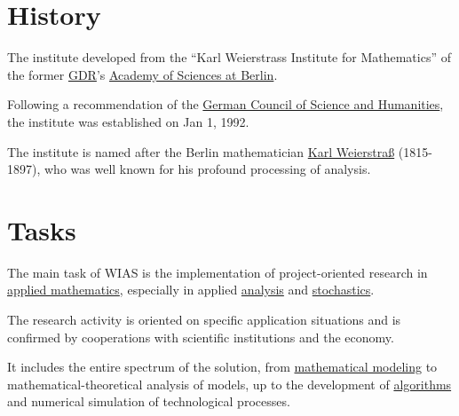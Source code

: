 \documentclass{book}
\numberwithin{equation}{section}
\begin{document}
\section{History}
The institute developed from the ``Karl Weierstrass Institute for Mathematics'' of the former \href{https://en.wikipedia.org/wiki/GDR}{GDR}'s \href{https://en.wikipedia.org/wiki/German_Academy_of_Sciences_at_Berlin}{Academy of Sciences at Berlin}.

Following a recommendation of the \href{https://en.wikipedia.org/wiki/German_Council_of_Science_and_Humanities}{German Council of Science and Humanities}, the institute was established on Jan 1, 1992.

%
The institute is named after the Berlin mathematician \href{https://en.wikipedia.org/wiki/Karl_Weierstra%C3%9F}{Karl Weierstraß} (1815-1897), who was well known for his profound processing of analysis.

\section{Tasks}
The main task of WIAS is the implementation of project-oriented research in \href{https://en.wikipedia.org/wiki/Applied_mathematics}{applied mathematics}, especially in applied \href{https://en.wikipedia.org/wiki/Analysis}{analysis} and \href{https://en.wikipedia.org/wiki/Stochastics}{stochastics}.

The research activity is oriented on specific application situations and is confirmed by cooperations with scientific institutions and the economy.

It includes the entire spectrum of the solution, from \href{https://en.wikipedia.org/wiki/Mathematical_model}{mathematical modeling} to mathematical-theoretical analysis of models, up to the development of \href{https://en.wikipedia.org/wiki/Algorithm}{algorithms} and numerical simulation of technological processes.
\end{document}
